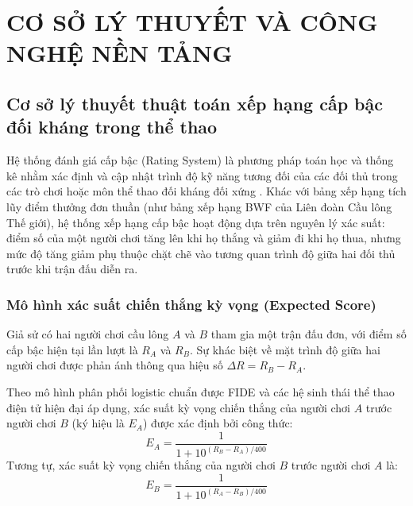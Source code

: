 
\chapter{CƠ SỞ LÝ THUYẾT VÀ CÔNG NGHỆ NỀN TẢNG}
\label{chap:cossolythuyet}

\section{Cơ sở lý thuyết thuật toán xếp hạng cấp bậc đối kháng trong thể thao}
\label{sec:lythuyet_elo}

Hệ thống đánh giá cấp bậc (Rating System) là phương pháp toán học và thống kê nhằm xác định và cập nhật trình độ kỹ năng tương đối của các đối thủ trong các trò chơi hoặc môn thể thao đối kháng đối xứng \cite{elo1978rating}. Khác với bảng xếp hạng tích lũy điểm thưởng đơn thuần (như bảng xếp hạng BWF của Liên đoàn Cầu lông Thế giới), hệ thống xếp hạng cấp bậc hoạt động dựa trên nguyên lý xác suất: điểm số của một người chơi tăng lên khi họ thắng và giảm đi khi họ thua, nhưng mức độ tăng giảm phụ thuộc chặt chẽ vào tương quan trình độ giữa hai đối thủ trước khi trận đấu diễn ra.

\subsection{Mô hình xác suất chiến thắng kỳ vọng (Expected Score)}
Giả sử có hai người chơi cầu lông $A$ và $B$ tham gia một trận đấu đơn, với điểm số cấp bậc hiện tại lần lượt là $R_A$ và $R_B$. Sự khác biệt về mặt trình độ giữa hai người chơi được phản ánh thông qua hiệu số $\Delta R = R_B - R_A$.

Theo mô hình phân phối logistic chuẩn được FIDE và các hệ sinh thái thể thao điện tử hiện đại áp dụng, xác suất kỳ vọng chiến thắng của người chơi $A$ trước người chơi $B$ (ký hiệu là $E_A$) được xác định bởi công thức:
\begin{equation}
    E_A = \frac{1}{1 + 10^{(R_B - R_A) / 400}}
    \label{eq:elo_expected_a}
\end{equation}
Tương tự, xác suất kỳ vọng chiến thắng của người chơi $B$ trước người chơi $A$ là:
\begin{equation}
    E_B = \frac{1}{1 + 10^{(R_A - R_B) / 400}}
    \label{eq:elo_expected_b}
\end{equation}

